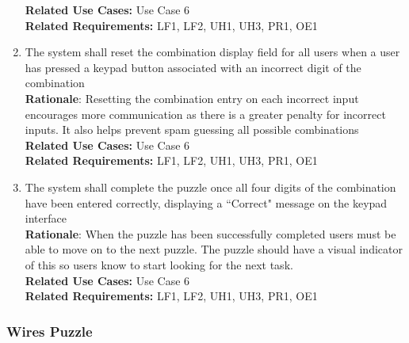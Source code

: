 \documentclass[12pt]{article}
\begin{document}
\begin{enumerate}[label=CP\arabic*., series=CombinationPuzzle]
        \textbf{Related Use Cases:} Use Case 6\\
        \textbf{Related Requirements:} LF1, LF2, UH1, UH3, PR1, OE1
        \item The system shall reset the combination display field for all users when a user has pressed a keypad button associated with an incorrect digit of the combination\\
        \textbf{Rationale}: Resetting the combination entry on each incorrect input encourages more communication as there is a greater penalty for incorrect inputs. It also helps prevent spam guessing all possible combinations\\
        \textbf{Related Use Cases:} Use Case 6\\
        \textbf{Related Requirements:} LF1, LF2, UH1, UH3, PR1, OE1
        \item The system shall complete the puzzle once all four digits of the combination have been entered correctly, displaying a ``Correct" message on the keypad interface\\
        \textbf{Rationale}: When the puzzle has been successfully completed users must be able to move on to the next puzzle. The puzzle should have a visual indicator of this so users know to start looking for the next task.\\
        \textbf{Related Use Cases:} Use Case 6\\
        \textbf{Related Requirements:} LF1, LF2, UH1, UH3, PR1, OE1
    \end{enumerate}

\subsubsection{Wires Puzzle}
\end{document}
